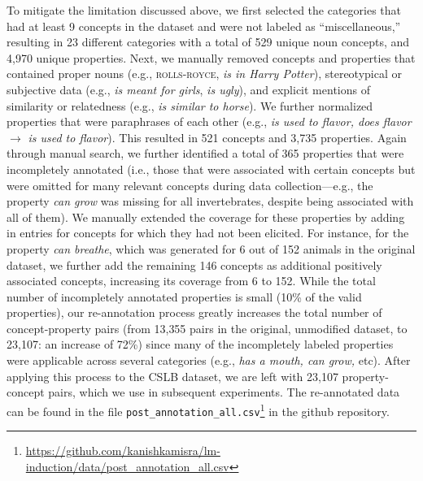 \documentclass[11pt]{article}    %
\begin{document}
To mitigate the limitation discussed above, we first selected the categories \citep[hand-annotated by][e.g., \textsc{bird, vehicle, tree}, etc.]{devereux2014centre} that had at least 9 concepts in the dataset and were not labeled as ``miscellaneous,'' resulting in 23 different categories with a total of 529 unique noun concepts, and 4{,}970 unique properties.
Next, we manually removed concepts and properties that contained proper nouns (e.g., \textsc{rolls-royce}, \textit{is in Harry Potter}), stereotypical or subjective data (e.g., \textit{is meant for girls}, \textit{is ugly}), and explicit mentions of similarity or relatedness (e.g., \textit{is similar to horse}). We further normalized properties that were paraphrases of each other (e.g., \textit{is used to flavor, does flavor} $\rightarrow$ \textit{is used to flavor}). This resulted in 521 concepts and  3{,}735 properties.
Again through manual search, we further identified a total of 365 properties that were incompletely annotated (i.e., those that were associated with certain concepts but were omitted for many relevant concepts during data collection---e.g., the property \textit{can grow} was missing for all invertebrates, despite being associated with all of them). 
We manually extended the coverage for these properties by adding in entries for concepts for which they had not been elicited. For instance, for the property \textit{can breathe}, which was generated for 6 out of 152 animals in the original dataset, we further add the remaining 146 concepts as additional positively associated concepts, increasing its coverage from 6 to 152.
While the total number of incompletely annotated properties is small (10\% of the valid properties), our re-annotation process greatly increases the total number of concept-property pairs (from 13{,}355 pairs in the original, unmodified dataset, to 23{,}107: an increase of 72\%) since many of the incompletely labeled properties were applicable across several categories (e.g., \textit{has a mouth, can grow,} etc).
After applying this process to the CSLB dataset, we are left with 23{,}107 property-concept pairs, which we use in subsequent experiments.
The re-annotated data can be found in the file \texttt{post\_annotation\_all.csv}\footnote{\url{https://github.com/kanishkamisra/lm-induction/data/post\_annotation\_all.csv}} in the github repository.
\end{document}
